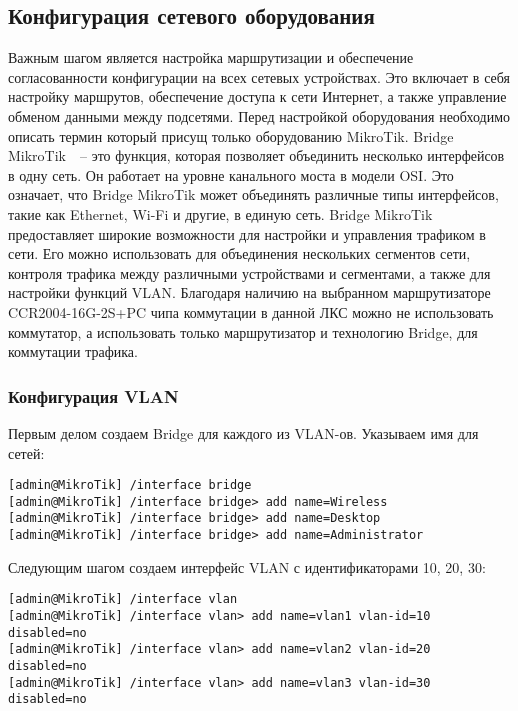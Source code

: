 \subsection{Конфигурация сетевого оборудования}
 
Важным шагом является настройка маршрутизации и обеспечение согласованности конфигурации на всех сетевых устройствах. Это включает в себя настройку маршрутов, обеспечение доступа к сети Интернет, а также управление обменом данными между подсетями. Перед настройкой оборудования необходимо описать термин который присущ только оборудованию MikroTik. Bridge MikroTik~\cite{bridge_mikro}~-- это функция, которая позволяет объединить несколько интерфейсов в одну сеть. Он работает на уровне канального моста в модели OSI. Это означает, что Bridge MikroTik может объединять различные типы интерфейсов, такие как Ethernet, Wi-Fi и другие, в единую сеть. Bridge MikroTik предоставляет широкие возможности для настройки и управления трафиком в сети. Его можно использовать для объединения нескольких сегментов сети, контроля трафика между различными устройствами и сегментами, а также для настройки функций VLAN. Благодаря наличию на выбранном маршрутизаторе CCR2004-16G-2S+PC чипа коммутации в данной ЛКС можно не использовать коммутатор, а использовать только маршрутизатор и технологию Bridge, для коммутации трафика.

\subsubsection{Конфигурация VLAN}

Первым делом создаем Bridge для каждого из VLAN-ов. Указываем имя для сетей:

\begin{lstlisting}
[admin@MikroTik] /interface bridge
[admin@MikroTik] /interface bridge> add name=Wireless
[admin@MikroTik] /interface bridge> add name=Desktop
[admin@MikroTik] /interface bridge> add name=Administrator
\end{lstlisting}

Следующим шагом создаем интерфейс VLAN с идентификаторами 10, 20, 30:

\begin{lstlisting}
[admin@MikroTik] /interface vlan
[admin@MikroTik] /interface vlan> add name=vlan1 vlan-id=10 disabled=no
[admin@MikroTik] /interface vlan> add name=vlan2 vlan-id=20 disabled=no
[admin@MikroTik] /interface vlan> add name=vlan3 vlan-id=30 disabled=no
\end{lstlisting}

